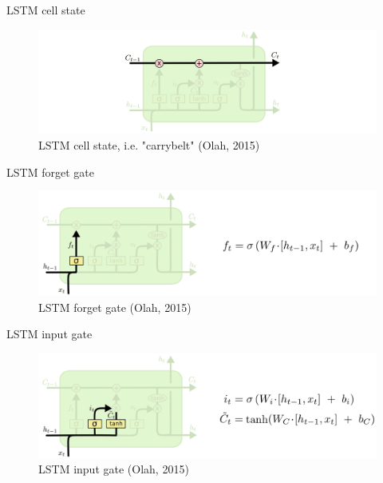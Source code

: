 \documentclass[10pt]{beamer}
\begin{document}
\begin{frame}{LSTM cell state}

\begin{figure}[h]
\centering
\includegraphics[width=1\textwidth]{fig/Olah_LSTM2.png}
\caption{LSTM cell state, i.e. "carrybelt" (Olah, 2015)}
\end{figure}

\end{frame}

\begin{frame}{LSTM forget gate}

\begin{figure}[h]
\centering
\includegraphics[width=1\textwidth]{fig/Olah_LSTM3_forget.png}
\caption{LSTM forget gate (Olah, 2015)}
\end{figure}

\end{frame}

\begin{frame}{LSTM input gate}

\begin{figure}[h]
\centering
\includegraphics[width=1\textwidth]{fig/Olah_LSTM3_update.png}
\caption{LSTM input gate (Olah, 2015)}
\end{figure}

\end{frame}
\end{document}
